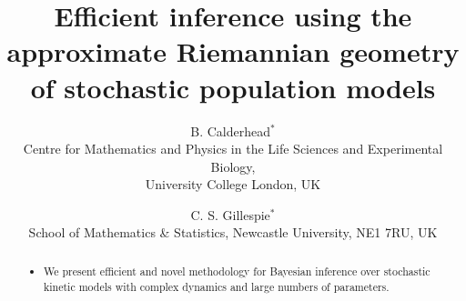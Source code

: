 \documentclass[useAMS,usenatbib,referee]{example/biom}
\title[Efficient inference using the approximate Riemannian geometry of stochastic population models]{Efficient inference using the approximate Riemannian geometry of stochastic population models}
\author{B. Calderhead$^{*}$\email{b.calderhead@ucl.ac.uk} \\
	   Centre for Mathematics and Physics in the Life Sciences and Experimental Biology,\\University College London, UK
	   \and 
	   C. S. Gillespie$^{*}$\email{colin.gillespie@newcastle.ac.uk}\\
	   School of Mathematics \& Statistics, Newcastle University,
	   NE1 7RU, UK
	   }
\begin{document}
\date{}

\pagerange{\pageref{firstpage}--\pageref{lastpage}} 



\label{firstpage}


\begin{abstract}
\begin{itemize}
\item We present efficient and novel methodology for Bayesian inference over stochastic kinetic models with complex dynamics and large numbers of parameters.


\end{itemize}
\end{abstract}
\end{document}
